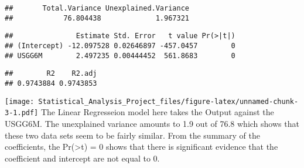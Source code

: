 \documentclass[]{article}
\newenvironment{Shaded}{\begin{snugshade}}{\end{snugshade}}
\newcommand{\KeywordTok}[1]{\textcolor[rgb]{0.13,0.29,0.53}{\textbf{#1}}}
\newcommand{\DataTypeTok}[1]{\textcolor[rgb]{0.13,0.29,0.53}{#1}}
\newcommand{\DecValTok}[1]{\textcolor[rgb]{0.00,0.00,0.81}{#1}}
\newcommand{\StringTok}[1]{\textcolor[rgb]{0.31,0.60,0.02}{#1}}
\newcommand{\OperatorTok}[1]{\textcolor[rgb]{0.81,0.36,0.00}{\textbf{#1}}}
\newcommand{\NormalTok}[1]{#1}
\begin{document}
\begin{verbatim}
##       Total.Variance Unexplained.Variance 
##            76.804438             1.967321
\end{verbatim}

\begin{Shaded}
\end{Shaded}

\begin{verbatim}
##               Estimate Std. Error   t value Pr(>|t|)
## (Intercept) -12.097528 0.02646897 -457.0457        0
## USGG6M        2.497235 0.00444452  561.8683        0
\end{verbatim}

\begin{Shaded}
\end{Shaded}

\begin{verbatim}
##        R2    R2.adj 
## 0.9743884 0.9743853
\end{verbatim}

\begin{Shaded}
\end{Shaded}

\texttt{[image: Statistical\_Analysis\_Project\_files/figure-latex/unnamed-chunk-3-1.pdf]}
The Linear Regresseion model here takes the Output against the USGG6M.
The unexplained variance amounts to 1.9 out of 76.8 which shows that
these two data sets seem to be fairly similar. From the summary of the
coefficients, the Pr(\textgreater{}t) = 0 shows that there is
significant evidence that the coefficient and intercept are not equal to
0.
\end{document}
